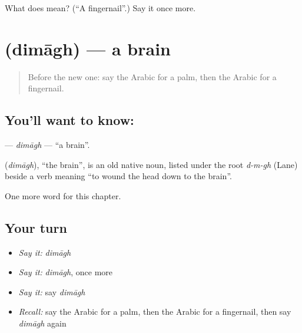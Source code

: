 \begin{tcolorbox}[breakable,colback=teal!4,colframe=teal!35!black,title={Before you move on}]
What does  mean? (\textquotedblleft{}A fingernail\textquotedblright{}.) Say it once more.
\end{tcolorbox}
\section[\texorpdfstring{\ar{دماغ} (dimāgh)}{دماغ (dimāgh)}]{ (dimāgh) — a brain}

\label{lesson:AR-C140-dimagh}



\begin{quote}
Before the new one: say the Arabic for a palm, then the Arabic for a fingernail.
\end{quote}

\subsection*{You'll want to know: }
\textbf{} — \emph{dimāgh} — \textquotedblleft{}a brain\textquotedblright{}.

\begin{cousinweb}
\textbf{} (\emph{dimāgh}), \textquotedblleft{}the brain\textquotedblright{}, is an old native noun, listed under the root \emph{d-m-gh} (Lane) beside a verb meaning \textquotedblleft{}to wound the head down to the brain\textquotedblright{}.
\end{cousinweb}

\begin{grammarlens}[title={What you've built}]
One more word for this chapter.
\end{grammarlens}

\subsection*{Your turn}
\begin{itemize}
\raggedright
  \item \emph{Say it:} \emph{dimāgh}
  \item \emph{Say it:} \emph{dimāgh}, once more
  \item \emph{Say it:} say \emph{dimāgh}
  \item \emph{Recall:} say the Arabic for a palm, then the Arabic for a fingernail, then say \emph{dimāgh} again
\end{itemize}

